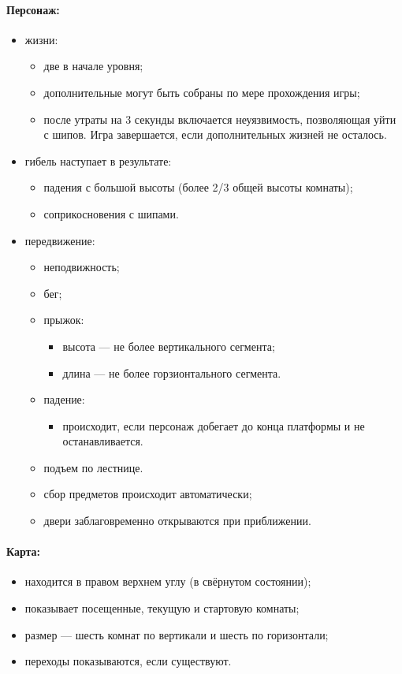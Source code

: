 \documentclass[12pt,a4paper,fullpage]{article}
\begin{document}
\paragraph{Персонаж:}
\begin{itemize}
	\item жизни:
	\begin{itemize}
		\item две в начале уровня;
		\item дополнительные могут быть собраны по мере прохождения игры;
		\item после утраты на 3 секунды включается неуязвимость, позволяющая уйти с шипов. Игра завершается, если дополнительных жизней не осталось.
	\end{itemize}
	\item гибель наступает в результате:
	\begin{itemize}
		\item падения с большой высоты (более 2/3 общей высоты комнаты);
		\item соприкосновения с шипами.
	\end{itemize}
	\item передвижение:
	\begin{itemize}
		\item неподвижность;
		\item бег;
		\item прыжок:
		\begin{itemize}
			\item высота --- не более вертикального сегмента;
			\item длина --- не более горзионтального сегмента.
		\end{itemize}
		\item падение:
		\begin{itemize}
			\item происходит, если персонаж добегает до конца платформы и не останавливается.
		\end{itemize}
		\item подъем по лестнице.
		\item сбор предметов происходит автоматически;
		\item двери заблаговременно открываются при приближении.
	\end{itemize}
\end{itemize}

\paragraph{Карта:} 
\begin{itemize}
	\item находится в правом верхнем углу (в свёрнутом состоянии);
	\item показывает посещенные, текущую и стартовую комнаты;
	\item размер --- шесть комнат по вертикали и шесть по горизонтали;
	\item переходы показываются, если существуют.
\end{itemize}
\end{document}

